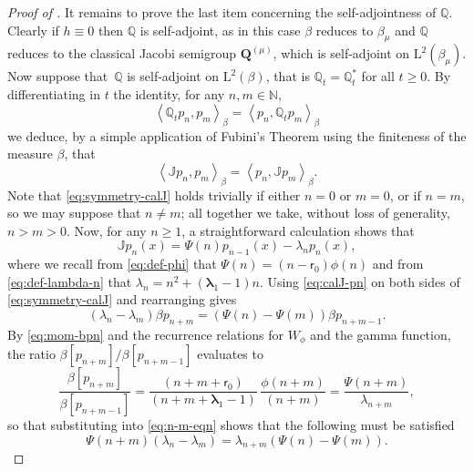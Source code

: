 \documentclass[JEP,XML,SOM,Unicode]{cedram}
\theoremstyle{plain}
\theoremstyle{definition}
\newcommand{\N}{\mathbb{N}}
\newcommand{\J}{\mathds{Q}}
\newcommand{\calJ}{\mathds{J}}
\newcommand{\Leb}{\mathrm{L}}
\newcommand{\lam}{{\bm{\lambda}_1}}
\newcommand{\tet}{{\mathsf{r}_0}}
\newcommand{\Q}[1][\mo]{\mathbf{Q}^{({#1})}}
\newcommand{\gab}[1][\lam,\mo]{{\beta_{#1}}}
\let\mo\mu
\let\bpsi\beta
\begin{document}
\begin{proof}[Proof of ]
It remains to prove the last item concerning the self-adjointness of $\J$. Clearly if $h \equiv 0$ then $\J$ is self-adjoint, as in this case $\bpsi$ reduces to $\gab[\mo]$ and $\J$ reduces to the classical Jacobi semigroup $\Q[\mo]$, which is self-adjoint on $\Leb^2(\gab[\mo])$. Now suppose that~$\J$ is self-adjoint on $\Leb^2(\bpsi)$, that is $\J_t = \J_t^*$ for all $t \geq 0$. By differentiating in $t$ the identity, for any $n, m \in \N$,
\begin{equation*}
\left\langle \J_t p_n, p_m \right\rangle_{\bpsi} = \left\langle p_n, \J_t p_m \right\rangle_{\bpsi}
\end{equation*}
we deduce, by a simple application of Fubini's Theorem using the finiteness of the measure $\bpsi$, that
\begin{equation}
\label{eq:symmetry-calJ}
\left\langle \calJ p_n, p_m \right\rangle_{\bpsi} = \left\langle p_n, \calJ p_m \right\rangle_{\bpsi}.
\end{equation}
Note that \eqref{eq:symmetry-calJ} holds trivially if either $n=0$ or $m=0$, or if $n=m$, so we may suppose that $n \neq m$; all together we take, without loss of generality, $n > m > 0$. Now, for any $n \geq 1$, a straightforward calculation shows that
\begin{equation}
\label{eq:calJ-pn}
\calJ p_n(x) = \Psi(n)p_{n-1}(x)-\lambda_n p_n(x),
\end{equation}
where we recall from \eqref{eq:def-phi} that $\Psi(n) = (n-\tet)\phi(n)$ and from \eqref{eq:def-lambda-n} that $\lambda_n = n^2+(\lam-1)n$. Using \eqref{eq:calJ-pn} on both sides of \eqref{eq:symmetry-calJ} and rearranging gives
\begin{equation}
\label{eq:n-m-eqn}
\left(\lambda_n-\lambda_m\right) \bpsi p_{n+m} = \left(\Psi(n)-\Psi(m)\right) \bpsi p_{n+m-1}.
\end{equation}
By \eqref{eq:mom-bpn} and the recurrence relations for $W_\phi$ and the gamma function, the ratio $\bpsi [p_{n+m}] / \bpsi [p_{n+m-1}]$ evaluates to
\begin{equation*}
\frac{\bpsi [p_{n+m}]}{\bpsi [p_{n+m-1}]} = \frac{(n+m+\tet)}{(n+m+\lam-1)}\,\frac{\phi(n+m)}{(n+m)} = \frac{\Psi(n+m)}{\lambda_{n+m}},
\end{equation*}
so that substituting into \eqref{eq:n-m-eqn} shows that the following must be satisfied
\begin{equation}
\label{eq:Psi-n-m}
\Psi(n+m)\left(\lambda_n-\lambda_m\right) = \lambda_{n+m}\left(\Psi(n)-\Psi(m)\right).
\end{equation}

\end{proof}
\end{document}
